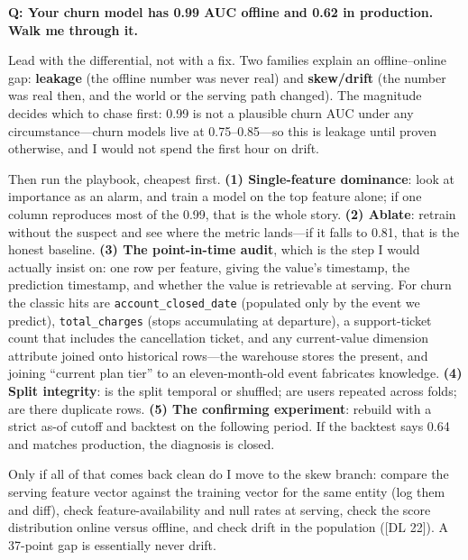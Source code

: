 \begin{interviewq}
\textbf{Q: Your churn model has 0.99 AUC offline and 0.62 in production. Walk me through it.}

 \quad {} \quad \badgefreq{\freqhigh}

\stronganswer

Lead with the differential, not with a fix. Two families explain an offline--online gap: \textbf{leakage} (the offline number was never real) and \textbf{skew/drift} (the number was real then, and the world or the serving path changed). The magnitude decides which to chase first: 0.99 is not a plausible churn AUC under any circumstance---churn models live at 0.75--0.85---so this is leakage until proven otherwise, and I would not spend the first hour on drift.

Then run the playbook, cheapest first. \textbf{(1) Single-feature dominance}: look at importance as an alarm, and train a model on the top feature alone; if one column reproduces most of the 0.99, that is the whole story. \textbf{(2) Ablate}: retrain without the suspect and see where the metric lands---if it falls to 0.81, that is the honest baseline. \textbf{(3) The point-in-time audit}, which is the step I would actually insist on: one row per feature, giving the value's timestamp, the prediction timestamp, and whether the value is retrievable at serving. For churn the classic hits are \texttt{account\_closed\_date} (populated only by the event we predict), \texttt{total\_charges} (stops accumulating at departure), a support-ticket count that includes the cancellation ticket, and any current-value dimension attribute joined onto historical rows---the warehouse stores the present, and joining ``current plan tier'' to an eleven-month-old event fabricates knowledge. \textbf{(4) Split integrity}: is the split temporal or shuffled; are users repeated across folds; are there duplicate rows. \textbf{(5) The confirming experiment}: rebuild with a strict as-of cutoff and backtest on the following period. If the backtest says 0.64 and matches production, the diagnosis is closed.

Only if all of that comes back clean do I move to the skew branch: compare the serving feature vector against the training vector for the same entity (log them and diff), check feature-availability and null rates at serving, check the score distribution online versus offline, and check drift in the population ([DL 22]). A 37-point gap is essentially never drift.


\end{interviewq}
